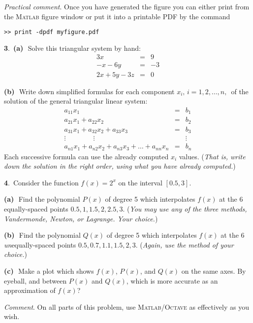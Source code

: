 \documentclass[12pt]{amsart}
\newcommand{\prob}[1]{\bigskip\noindent\large\textbf{#1}.\,\normalsize }
\newcommand{\ppart}[1]{\textbf{(#1)}\,\, }
\newcommand{\epart}[1]{\medskip\noindent\textbf{(#1)}\,\, }
\newcommand{\Matlab}{\textsc{Matlab}\xspace}
\newcommand{\Octave}{\textsc{Octave}\xspace}
\newcommand{\MO}{\Matlab/\Octave}
\begin{document}
\emph{Practical comment}.  Once you have generated the figure you can either print from the \Matlab figure window or put it into a printable PDF by the command

\small \texttt{>> print -dpdf myfigure.pdf}

\prob{3}  \ppart{a} Solve this triangular system by hand:
$$\begin{array}{lcl}
3x & = & 9 \\
-x - 6y    & = & -3 \\
2x + 5y - 3 z & = & 0
\end{array}$$

\epart{b} Write down simplified formulas for each component $x_i,\, i=1,2,\dots,n,\,$ of the solution of the general triangular linear system:
$$\begin{array}{lcl}
a_{11} x_1      &=& b_1 \\
a_{21} x_1 + a_{22} x_2     &=& b_2 \\
a_{31} x_1 + a_{32} x_2 + a_{33} x_3  &=& b_3 \\
\vdots  \qquad \qquad \vdots & & \vdots \\
a_{n1} x_1 + a_{n2} x_2 + a_{n3} x_3 + \dots + a_{nn} x_n &=& b_n
\end{array}$$
Each successive formula can use the already computed $x_i$ values.  (\emph{That is, write down the solution in the right order, using what you have already computed.})

\prob{4}  Consider the function $f(x) = 2^x$ on the interval $[0.5,3]$.

\epart{a} Find the polynomial $P(x)$ of degree 5 which interpolates $f(x)$ at the 6 equally-spaced points $0.5,1,1.5,2,2.5,3$.  (\emph{You may use any of the three methods, Vandermonde, Newton, or Lagrange.  Your choice.})

\epart{b} Find the polynomial $Q(x)$ of degree 5 which interpolates $f(x)$ at the 6 \emph{un}equally-spaced points $0.5,0.7,1.1,1.5,2,3$.  (\emph{Again, use the method of your choice.})

\epart{c} Make a plot which shows $f(x)$, $P(x)$, and $Q(x)$ on the same axes.  By eyeball, and between $P(x)$ and $Q(x)$, which is more accurate as an approximation of $f(x)$?

\medskip\noindent\emph{Comment}.  On all parts of this problem, use \MO as effectively as you wish.
\end{document}

